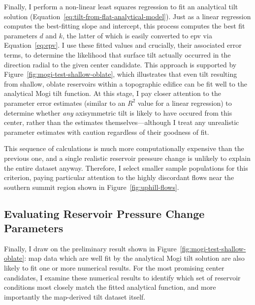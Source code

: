 Finally, I perform a non-linear least squares regression to fit an analytical tilt solution (Equation~\eqref{eq:tilt-from-flat-analytical-model}). Just as a linear regression computes the best-fitting slope and intercept, this process computes the best fit parameters $d$ and $k$, the latter of which is easily converted to \acs{epv} via Equation~\eqref{eq:epv}. I use these fitted values and crucially, their associated error terms, to determine the likelihood that surface tilt actually occurred in the direction radial to the given center candidate. This approach is supported by Figure~\ref{fig:mogi-test-shallow-oblate}, which illustrates that even tilt resulting from shallow, oblate reservoirs within a topographic edifice can be fit well to the analytical Mogi tilt function. At this stage, I pay closer attention to the parameter error estimates (similar to an $R^2$ value for a linear regression) to determine whether \emph{any} axisymmetric tilt is likely to have occured from this center, rather than the estimates themselves---although I treat any unrealistic parameter estimates with caution regardless of their goodness of fit.

This sequence of calculations is much more computationally expensive than the previous one, and a single realistic reservoir pressure change is unlikely to explain the entire dataset anyway. Therefore, I select smaller sample populations for this criterion, paying particular attention to the highly discordant flows near the southern summit region shown in Figure~\ref{fig:uphill-flows}.

\subsection{Evaluating Reservoir Pressure Change Parameters}

Finally, I draw on the preliminary result shown in Figure~\ref{fig:mogi-test-shallow-oblate}: map data which are well fit by the analytical Mogi tilt solution are also likely to fit one or more numerical results. For the most promising center candidates, I examine these numerical results to identify which set of reservoir conditions most closely match the fitted analytical function, and more importantly the map-derived tilt dataset itself.
